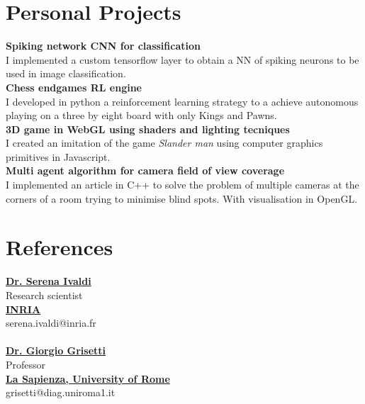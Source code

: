 \documentclass[
	12pt, %
]{../templates/FreemanCV}
\begin{document}
\begin{paracol}{2} %

\section{Personal Projects}

  \textbf{Spiking network CNN for classification}\\
  I implemented a custom tensorflow layer to obtain a NN of spiking neurons to be used in image classification.
  \medskip\\
  \textbf{Chess endgames RL engine}\\
  I developed in python a reinforcement learning strategy to a achieve autonomous playing on a three by eight
  board with only Kings and Pawns.
  \medskip\\
  \textbf{3D game in WebGL using shaders and lighting tecniques}\\
  I created an imitation of the game \textit{Slander man} using computer graphics primitives in Javascript.
  \medskip\\
  \textbf{Multi agent algorithm for camera field of view coverage}\\
  I implemented an article in C++ to solve the problem of multiple cameras at the corners of a room trying
  to minimise blind spots. With visualisation in OpenGL.

\switchcolumn %

\section{References}
  \href{https://members.loria.fr/SIvaldi/}{\textbf{Dr. Serena Ivaldi}}\\
  Research scientist\\
  \href{https://www.inria.fr/}{\textbf{INRIA}}\\
  serena.ivaldi@inria.fr\\\\
  \href{https://sites.google.com/dis.uniroma1.it/grisetti/home}{\textbf{Dr. Giorgio Grisetti}}\\
  Professor\\
  \href{https://www.uniroma1.it/}{\textbf{La Sapienza, University of Rome}}\\
  grisetti@diag.uniroma1.it

\end{paracol} %
\end{document}
